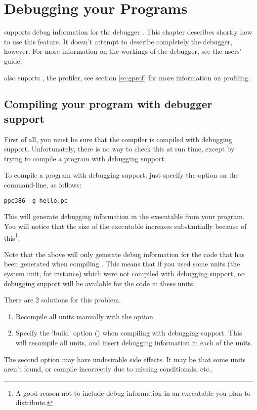 \documentclass{report}
\begin{document}

\chapter{Debugging your Programs}

\fpc supports debug information for the \gnu debugger . 
This chapter describes shortly how to use this feature. It doesn't attempt
to describe completely the \gnu debugger, however.
For more information on the workings of the \gnu debugger, see the 
users' guide.

\fpc also suports , the \gnu profiler, see section \ref{se:gprof}
for more information on profiling.

\section{Compiling your program with debugger support}
First of all, you must be sure that the compiler is compiled with debugging
support. Unfortunately, there is no way to check this at run time, except by
trying to compile a program with debugging support.

To compile a program with debugging support, just specify the 
option on the command-line, as follows:
\begin{verbatim}
ppc386 -g hello.pp
\end{verbatim}
This will generate debugging information in the executable from your
program. You will notice that the size of the executable increases
substantially because of this\footnote{A good reason not to include debug
information in an executable you plan to distribute.}. 

Note that the above will only generate debug information {\var for the code
that has been generated} when compiling . This means that if
you used some units (the system unit, for instance) which were not compiled
with debugging support, no debugging support will be available for the code
in these units. 

There are 2 solutions for this problem. 
\begin{enumerate}
\item Recompile all units manually with the  option. 
\item Specify the 'build' option () when compiling with debugging
support. This will recompile all units, and insert debugging information in
each of the units.
\end{enumerate}
The second option may have undesirable side effects. It may be that some
units aren't found, or compile incorrectly due to missing conditionals,
etc..
\end{document}
